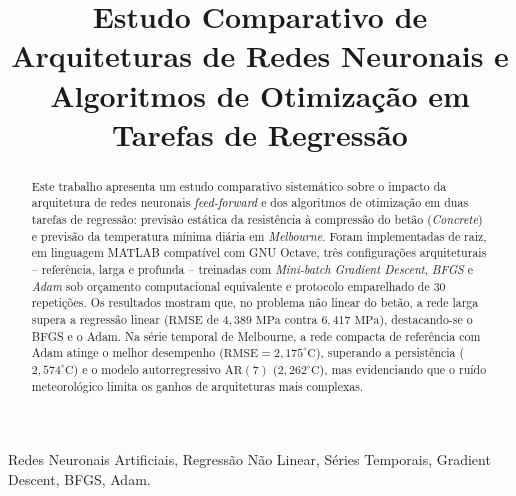 \documentclass[conference]{IEEEtran}
\begin{document}
\title{Estudo Comparativo de Arquiteturas de Redes Neuronais e Algoritmos de Otimização em Tarefas de Regressão}

\author{
\and
{}
}

\maketitle

\begin{abstract}
Este trabalho apresenta um estudo comparativo sistemático sobre o impacto da arquitetura de redes neuronais \textit{feed-forward} e dos algoritmos de otimização em duas tarefas de regressão: previsão estática da resistência à compressão do betão (\textit{Concrete}) e previsão da temperatura mínima diária em \textit{Melbourne}. Foram implementadas de raiz, em linguagem MATLAB compatível com GNU Octave, três configurações arquiteturais -- referência, larga e profunda -- treinadas com \textit{Mini-batch Gradient Descent}, \textit{BFGS} e \textit{Adam} sob orçamento computacional equivalente e protocolo emparelhado de $30$ repetições. Os resultados mostram que, no problema não linear do betão, a rede larga supera a regressão linear ($\text{RMSE}$ de $4{,}389\text{ MPa}$ contra $6{,}417\text{ MPa}$), destacando-se o BFGS e o Adam. Na série temporal de Melbourne, a rede compacta de referência com Adam atinge o melhor desempenho ($\text{RMSE} = 2{,}175^{\circ}\text{C}$), superando a persistência ($2{,}574^{\circ}\text{C}$) e o modelo autorregressivo $\text{AR}(7)$ ($2{,}262^{\circ}\text{C}$), mas evidenciando que o ruído meteorológico limita os ganhos de arquiteturas mais complexas.
\end{abstract}

\begin{IEEEkeywords}
Redes Neuronais Artificiais, Regressão Não Linear, Séries Temporais, Gradient Descent, BFGS, Adam.
\end{IEEEkeywords}
\end{document}
